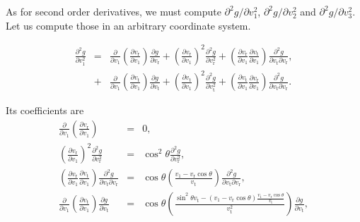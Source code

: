 \documentclass[11pt]{article}
\newcommand{\rt}{\mathrm{t}}
\newcommand{\rr}{\mathrm{r}}
\newcommand{\vr}{v_{\rr}}
\newcommand{\vt}{v_{\rt}}
\begin{document}
\begin{appendices}
As for second order derivatives, we must compute ${\partial^{2}g}/{\partial v_{1}^{2}}$, ${\partial^{2}g}/{\partial v_{2}^{2}}$ and ${\partial^{2}g}/{\partial v_{3}^{2}}$. Let us compute those in an arbitrary coordinate system.

\begin{equation}
\begin{array}{ccl}
  \displaystyle{\frac{\partial^{2}g}{\partial v_{1}^{2}}}&=& \displaystyle{\frac{\partial}{\partial v_{1}}\left(\frac{\partial \vr}{\partial v_{1}}\right)\frac{\partial g}{\partial \vr}+\left(\frac{\partial \vr}{\partial v_{1}}\right)^{2}\frac{\partial^{2}g}{\partial \vr^{2}}+\left(\frac{\partial \vr}{\partial v_{1}}\frac{\partial \vt}{\partial v_{1}}\right)\frac{\partial^{2}g}{\partial \vt\partial \vr}} ,\\

  {} &+& \displaystyle{\frac{\partial}{\partial v_{1}}\left(\frac{\partial \vt}{\partial v_{1}}\right)\frac{\partial g}{\partial \vt}+\left(\frac{\partial \vt}{\partial v_{1}}\right)^{2}\frac{\partial^{2}g}{\partial \vt^{2}}+\left(\frac{\partial \vt}{\partial v_{1}}\frac{\partial \vr}{\partial v_{1}}\right)\frac{\partial^{2}g}{\partial \vt\partial \vr}} .
\end{array}
\label{eq:d2gdv12_Arbitrary}
\end{equation}

Its coefficients are
\begin{equation}
\begin{array}{ccl}
  \displaystyle{\frac{\partial}{\partial v_{1}}\left(\frac{\partial \vr}{\partial v_{1}}\right)}&=& \displaystyle{0} ,\\
  \displaystyle{\left(\frac{\partial \vr}{\partial v_{1}}\right)^{2}\frac{\partial^{2}g}{\partial \vr^{2}}}&=& \displaystyle{\cos^{2}\theta\frac{\partial^{2}g}{\partial \vr^{2}}} ,\\
  \displaystyle{\left(\frac{\partial \vr}{\partial v_{1}}\frac{\partial \vt}{\partial v_{1}}\right)\frac{\partial^{2}g}{\partial \vt\partial \vr}}&=& \displaystyle{\cos\theta\left(\frac{v_{1}-\vr\cos\theta}{\vt}\right)\frac{\partial^{2}g}{\partial \vt\partial \vr}} ,\\
  \displaystyle{\frac{\partial}{\partial v_{1}}\left(\frac{\partial \vt}{\partial v_{1}}\right)\frac{\partial g}{\partial \vt}}&=& \displaystyle{\cos\theta\left(\frac{\sin^{2}\theta \vt-(v_{1}-\vr\cos\theta)\frac{v_{1}-\vr\cos\theta}{\vt}}{\vt^{2}}\right)\frac{\partial g}{\partial \vt}} ,\\
 


\end{array}
\end{equation}
\end{appendices}
\end{document}
